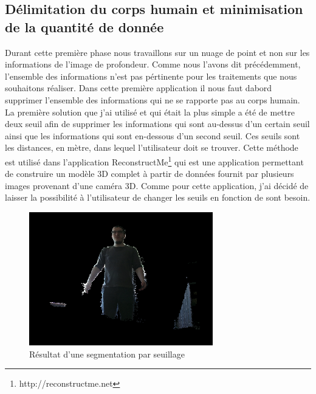 \subsection{Délimitation du corps humain et minimisation de la quantité de donnée}
Durant cette première phase nous travaillons sur un nuage de point et non sur les informations de l'image de profondeur.
Comme nous l'avons dit précédemment, l'ensemble des informations n'est pas pértinente pour les traitements que nous souhaitons
réaliser. Dans cette première application il nous faut dabord supprimer l'ensemble des informations qui ne se rapporte pas 
au corps humain. La première solution que j'ai utilisé et qui était la plus simple a été de mettre deux seuil afin de 
supprimer les informations qui sont au-dessus d'un certain seuil ainsi que les informations qui sont en-dessous d'un second
seuil. Ces seuils sont les distances, en mètre, dans lequel l'utilisateur doit se trouver. Cette méthode est utilisé dans 
l'application ReconstructMe\footnote{http://reconstructme.net} qui est une application permettant de construire un modèle
3D complet à partir de données fournit par plusieurs images provenant d'une caméra 3D. Comme pour cette application, j'ai
décidé de laisser la possibilité à l'utilisateur de changer les seuils en fonction de sont besoin.\\

\begin{figure}[!ht]
  \begin{center}
    \includegraphics[width=8cm]{image/seuil1.PNG}
    \caption{Résultat d'une segmentation par seuillage}
    \label{fig:seuillage}
  \end{center}
\end{figure}

